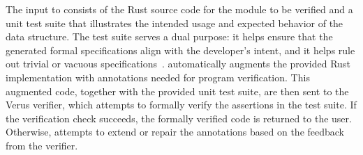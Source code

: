 


The input to \toolname{} consists of 
the Rust source code for the module to be verified and a unit test suite that illustrates the intended usage and expected behavior of the data structure. The test suite serves a dual purpose: it helps ensure that the generated formal specifications align with the developer's intent, and it helps rule out trivial or vacuous specifications~\cite{test-intent}.
%
\toolname{} automatically augments the provided Rust implementation with annotations needed for program verification. This augmented code, together with the provided unit test suite, are then sent to the Verus verifier, which attempts to formally verify the assertions in the test suite. If the verification check succeeds, the formally verified code is returned to the user.  Otherwise, \toolname{} attempts to extend or repair the annotations based on the feedback from the verifier. %


